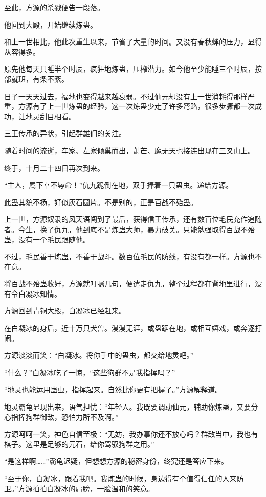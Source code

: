 \begin{this_body}
至此，方源的杀戮便告一段落。

他回到大殿，开始继续炼蛊。

和上一世相比，他此次重生以来，节省了大量的时间。又没有春秋蝉的压力，显得从容得多。

原先他每天只睡半个时辰，疯狂地炼蛊，压榨潜力。如今他至少能睡三个时辰，按部就班，有条不紊。

日子一天天过去，福地也变得越来越衰弱。不过仙元却没有上一世消耗得那样严重，方源有了上一世炼蛊的经验，这一次炼蛊少走了许多弯路，很多步骤都一次成功，让地灵刮目相看。

三王传承的异状，引起群雄们的关注。

随着时间的流逝，车家、左家倾巢而出，萧芒、魔无天也接连出现在三叉山上。

终于，十月二十四日再次到来。

“主人，属下幸不辱命！”仇九跪倒在地，双手捧着一只蛊虫。递给方源。

此蛊其貌不扬，好似灰石圆片。不是别的，正是百战不殆蛊。

上一世，方源奴隶的风天语闯到了最后，获得信王传承，还有数百位毛民充作追随者。今生，换了仇九，他到底不是炼蛊大师，暴力破关。只能勉强取得百战不殆蛊，没有一个毛民跟随他。

不过，毛民善于炼蛊，不善于战斗。数百位毛民的防线，有没有都一样。方源也不在意。

将百战不殆蛊收好，方源就叮嘱几句，便遣走仇九，整个过程都在背地里进行，没有令白凝冰知情。

方源回到青铜大殿，白凝冰已经赶来。

在白凝冰的身后，近十万只犬兽。漫漫无涯，或盘踞在地，或相互嬉戏，或奔逐打闹。

方源淡淡而笑：“白凝冰。将你手中的蛊虫，都交给地灵吧。”

“什么？”白凝冰吃了一惊，“这些狗群不是我指挥吗？”

“地灵也能运用蛊虫，指挥起来。自然比你更有把握了。”方源解释道。

地灵霸龟显现出来，语气担忧：“年轻人。我既要调动仙元，辅助你炼蛊，又要分心指挥狗群御敌，恐怕力所不及啊。”

方源呵呵一笑，神色自信至极：“无妨，我办事你还不放心吗？群敌当中，我也有棋子。这里是足够的元石，给你驾驭狗群之用。”

“是这样啊……”霸龟迟疑，但想想方源的秘密身份，终究还是答应下来。

“至于你，白凝冰，跟着我吧。我炼蛊的时候，身边得有个值得信任的人来防卫。”方源拍拍白凝冰的肩膀，一脸温和的笑意。


\end{this_body}
